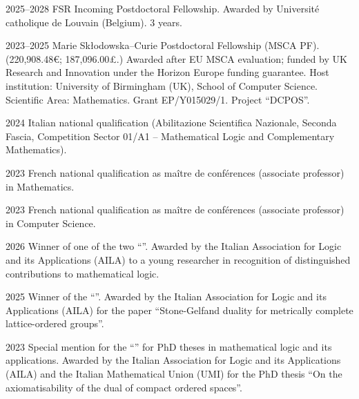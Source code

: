 

\chronorow
  {2025--2028}
  {FSR Incoming Postdoctoral Fellowship.}
  {Awarded by Université catholique de Louvain (Belgium). 3 years.}

\chronorow
  {2023--2025}
  {Marie Sk{\l}odowska--Curie Postdoctoral Fellowship (MSCA PF).}
  {(220,908.48€; 187,096.00£.) Awarded after EU MSCA evaluation; funded by UK Research and Innovation under
   the Horizon Europe funding guarantee. Host institution: University of Birmingham (UK), School of Computer
   Science. Scientific Area: Mathematics. Grant EP/Y015029/1. Project “DCPOS”.}


\chronorow
  {2024}
  {Italian national qualification}
  {(Abilitazione Scientifica Nazionale, Seconda Fascia, Competition Sector 01/A1 -- Mathematical Logic and
   Complementary Mathematics).}

\chronorow
  {2023}
  {French national qualification}
  {as maître de conférences (associate professor) in Mathematics.}

\chronorow
  {2023}
  {French national qualification}
  {as maître de conférences (associate professor) in Computer Science.}


\chronorow
  {2026}
  {Winner of one of the two ``''.}
  {Awarded by the Italian Association for Logic and its Applications (AILA) to a young researcher in
   recognition of distinguished contributions to mathematical logic.}

\chronorow
  {2025}
  {Winner of the “”.}
  {Awarded by the Italian Association for Logic and its Applications (AILA) for the paper ``Stone-Gelfand
   duality for metrically complete lattice-ordered groups''.}

\chronorow
  {2023}
  {Special mention for the ``'' for PhD theses in mathematical logic and its applications.}
  {Awarded by the Italian Association for Logic and its Applications (AILA) and the Italian Mathematical
   Union (UMI) for the PhD thesis ``On the axiomatisability of the dual of compact ordered spaces''.}


